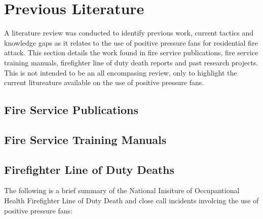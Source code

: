 \documentclass{article}
\begin{document}
\clearpage

\section{Previous Literature}
A literature review was conducted to identify previous work, current tactics and knowledge gaps as it relates to the use of positive pressure fans for residential fire attack. This section details the work found in fire service publications, fire service training manuals, firefighter line of duty death reports and past research projects. This is not intended to be an all encompasing review, only to highlight the current litureature available on the use of positive pressure fans. 

\subsection{Fire Service Publications}

\subsection{Fire Service Training Manuals}



\subsection{Firefighter Line of Duty Deaths}
The following is a brief summary of the National Inisiture of Occupantional Health Firefighter Line of Duty Death and close call incidents involcing the use of positive pressure fans: 
\end{document}
